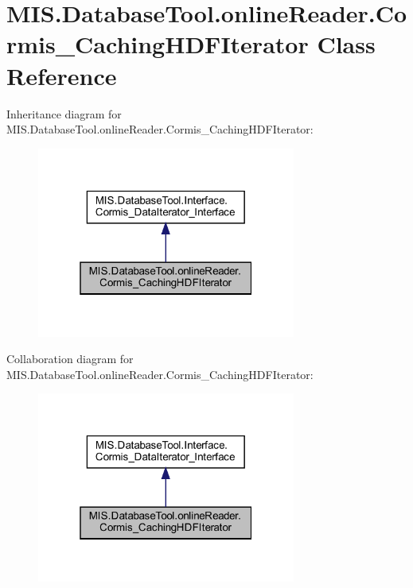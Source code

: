 \hypertarget{classMIS_1_1DatabaseTool_1_1onlineReader_1_1Cormis__CachingHDFIterator}{}\section{M\+I\+S.\+Database\+Tool.\+online\+Reader.\+Cormis\+\_\+\+Caching\+H\+D\+F\+Iterator Class Reference}
\label{classMIS_1_1DatabaseTool_1_1onlineReader_1_1Cormis__CachingHDFIterator}


Inheritance diagram for M\+I\+S.\+Database\+Tool.\+online\+Reader.\+Cormis\+\_\+\+Caching\+H\+D\+F\+Iterator\+:\nopagebreak
\begin{figure}[H]
\begin{center}
\leavevmode
\includegraphics[width=241pt]{classMIS_1_1DatabaseTool_1_1onlineReader_1_1Cormis__CachingHDFIterator__inherit__graph}
\end{center}
\end{figure}


Collaboration diagram for M\+I\+S.\+Database\+Tool.\+online\+Reader.\+Cormis\+\_\+\+Caching\+H\+D\+F\+Iterator\+:\nopagebreak
\begin{figure}[H]
\begin{center}
\leavevmode
\includegraphics[width=241pt]{classMIS_1_1DatabaseTool_1_1onlineReader_1_1Cormis__CachingHDFIterator__coll__graph}
\end{center}
\end{figure}
